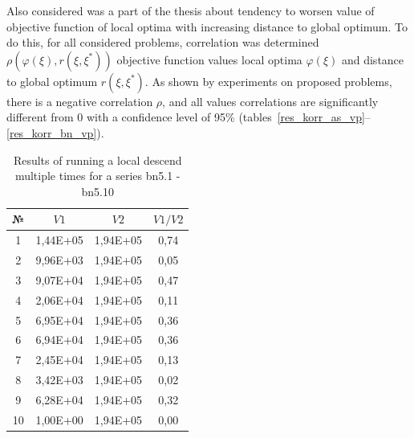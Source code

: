 \documentclass{ifacconf}
\begin{document}
Also considered was a part of the thesis about tendency to worsen value of objective function of local optima
with increasing distance to global optimum. To do this, for all considered problems,  correlation was determined
$\rho(\varphi(\xi),r(\xi,\xi^*))$ objective function values
local optima $\varphi(\xi)$ and distance to global optimum $r(\xi,\xi^*)$.
As shown by experiments on proposed problems, there is a negative correlation $\rho$, and all values
correlations are significantly different from 0 with a confidence level of 95\% (tables~\ref{res_korr_as_vp}--\ref{res_korr_bn_vp}).
\begin{table}[h!]
	\vspace{1cm}
	\centering
	\begin{tabular}{|c|c|c|c|}
		\hline
		\hspace*{0.1cm}№\hspace*{0.1cm} &
		\hspace*{0.1cm}$V1$\hspace*{0.1cm}&
		\hspace*{0.1cm}$V2$\hspace*{0.1cm}&
		\hspace*{0.1cm}$V1/V2$\hspace*{0.1cm}\\
		\hline
		1 &  1,44E+05  &  1,94E+05  &  0,74\\
		2 &  9,96E+03  &  1,94E+05  &  0,05\\
		3 &  9,07E+04  &  1,94E+05  &  0,47\\
		4 &  2,06E+04  &  1,94E+05  &  0,11\\
		5 &  6,95E+04  &  1,94E+05  &  0,36\\
		6 &  6,94E+04  &  1,94E+05  &  0,36\\
		7 &  2,45E+04  &  1,94E+05  &  0,13\\
		8 &  3,42E+03  &  1,94E+05  &  0,02\\
		9 &  6,28E+04  &  1,94E+05  &  0,32\\
		10&  1,00E+00  &  1,94E+05  &  0,00\\
		\hline
	\end{tabular}
	\vspace{1em}
	\caption{Results of running a local descend multiple times for a series bn5.1 - bn5.10}	\label{spher_bn}
\end{table}
\end{document}
